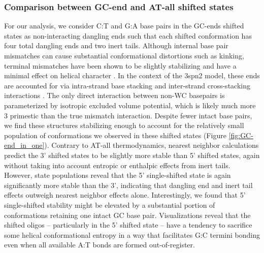 \documentclass[journal=jpcbfk,manuscript=article]{achemso}
\begin{document}
\subsubsection{Comparison between GC-end and AT-all shifted states}

For our analysis, we consider C:T and G:A base pairs in the GC-ends shifted states as non-interacting dangling ends such that each shifted conformation has four total dangling ends and two inert tails. Although internal base pair mismatches can cause substantial conformational distortions such as kinking, terminal mismatches have been shown to be slightly stabilizing and have a minimal effect on helical character \citep{Santalucia2004TM, DiMichele2014EffectHybridization}. In the context of the 3spn2 model, these ends are accounted for via intra-strand base stacking and inter-strand cross-stacking interactions \citep{Hinckley2013AnHybridization}. The only direct interaction between non-WC basepairs is parameterized by isotropic excluded volume potential, which is likely much more 3 primestic than the true mismatch interaction. Despite fewer intact base pairs, we find these structures stabilizing enough to account for the relatively small population of conformations we observed in these shifted states (Figure \ref{fig:GC-end_in_one}). Contrary to AT-all thermodynamics, nearest neighbor calculations predict the 3' shifted states to be slightly more stable than 5' shifted states, again without taking into account entropic or enthalpic effects from inert tails. However, state populations reveal that the 5' single-shifted state is again significantly more stable than the 3', indicating that dangling end and inert tail effects outweigh nearest neighbor effects alone. Interestingly, we found that 5' single-shifted stability might be elevated by a substantial portion of conformations retaining one intact GC base pair. Visualizations reveal that the shifted oligos -- particularly in the 5' shifted state -- have a tendency to sacrifice some helical conformational entropy in a way that facilitates G:C termini bonding even when all available A:T bonds are formed out-of-register.
\end{document}
